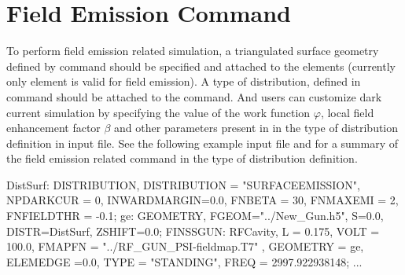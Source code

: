 \section{Field Emission Command}
\label{sec:FieldEmissionCmd}
To perform field emission related simulation, a triangulated surface geometry defined by  command  should be specified and attached to the elements (currently only  element is valid for field emission). A  type of distribution, defined in  command should be attached to the  command. And users can customize dark current simulation by specifying the value of the work
function $\varphi$, local field enhancement factor $\beta$ and other parameters
present in  in the  type of distribution definition in input file. See the following example input file and  for a summary of the field emission related command in the  type of distribution definition.
\begin{example}
DistSurf: DISTRIBUTION, DISTRIBUTION = "SURFACEEMISSION",
          NPDARKCUR = 0, INWARDMARGIN=0.0,
          FNBETA = 30, FNMAXEMI = 2,
          FNFIELDTHR = -0.1;
ge:       GEOMETRY, FGEOM="../New_Gun.h5",
          S=0.0, DISTR=DistSurf,
          ZSHIFT=0.0;
FINSSGUN: RFCavity, L = 0.175,
          VOLT = 100.0, FMAPFN = "../RF_GUN_PSI-fieldmap.T7" ,
          GEOMETRY = ge, ELEMEDGE =0.0,
          TYPE = "STANDING", FREQ = 2997.922938148;
...
\end{example}


